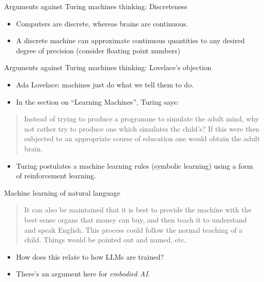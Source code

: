 \documentclass[10pt]{beamer}
\begin{document}
\begin{titledslide}{Arguments against Turing machines thinking:
    Discreteness}

  \begin{itemize}
  \item Computers are discrete, whereas brains are continuous.
  \item A discrete machine can approximate continuous quantities to
    any desired degree of precision (consider floating point numbers)
  \end{itemize}
  
\end{titledslide}
\begin{titledslide}{Arguments against Turing machines thinking:
    Lovelace's objection}


  \begin{itemize}
  \item Ada Lovelace: machines just do what we tell them to do.
  \item In the section on ``Learning Machines'', Turing says:
  \end{itemize}

  \begin{quote}
    Instead of trying to produce a programme to simulate the adult
    mind, why not rather try to produce one which simulates the
    child's? If this were then subjected to an appropriate course of
    education one would obtain the adult brain.
  \end{quote}

  \begin{itemize}
  \item Turing postulates a machine learning rules (symbolic learning)
    using a form of reinforcement learning.
  \end{itemize}
\end{titledslide}
\begin{titledslide}{Machine learning of natural language}

  \begin{quote}
    It can also be maintained that it is best to provide the machine
    with the best sense organs that money can buy, and then teach it
    to understand and speak English. This process could follow the
    normal teaching of a child. Things would be pointed out and named,
    etc.
  \end{quote}

  \begin{itemize}
  \item How does this relate to how LLMs are trained?
  \item There's an argument here for \emph{embodied AI}.
  \end{itemize}
    
\end{titledslide}
\end{document}
